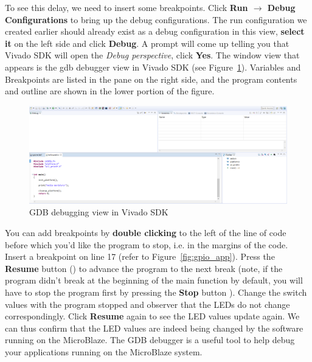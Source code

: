 \documentclass[11pt]{article}
\begin{document}
To see this delay, we need to insert some breakpoints. Click \textbf{Run $\rightarrow$ Debug Configurations} to bring up the debug configurations. The run configuration we created earlier should already exist as a debug configuration in this view, \textbf{select it} on the left side and click \textbf{Debug}. A prompt will come up telling you that Vivado SDK will open the \textit{Debug perspective}, click \textbf{Yes}. The window view that appears is the gdb debugger view in Vivado SDK (see Figure~\ref{fig:gdb_view}). Variables and Breakpoints are listed in the pane on the right side, and the program contents and outline are shown in the lower portion of the figure.

\begin{figure}[h]
    \centering
    \includegraphics[width=\textwidth]{images/gdb_view.png}
    \caption{GDB debugging view in Vivado SDK}
    \label{fig:gdb_view}
\end{figure}

\newpage
You can add breakpoints by \textbf{double clicking} to the left of the line of code before which you'd like the program to stop, i.e. in the margins of the code. Insert a breakpoint on line 17 (refer to Figure~\ref{fig:gpio_app}). Press the \textbf{Resume} button
()
to advance the program to the next break (note, if the program didn't break at the beginning of the main function by default, you will have to stop the program first by pressing the \textbf{Stop} button
). Change the switch values with the program stopped and observer that the LEDs do not change correspondingly. Click \textbf{Resume} again to see the LED values update again. We can thus confirm that the LED values are indeed being changed by the software running on the MicroBlaze. The GDB debugger is a useful tool to help debug your applications running on the MicroBlaze system.
\end{document}
